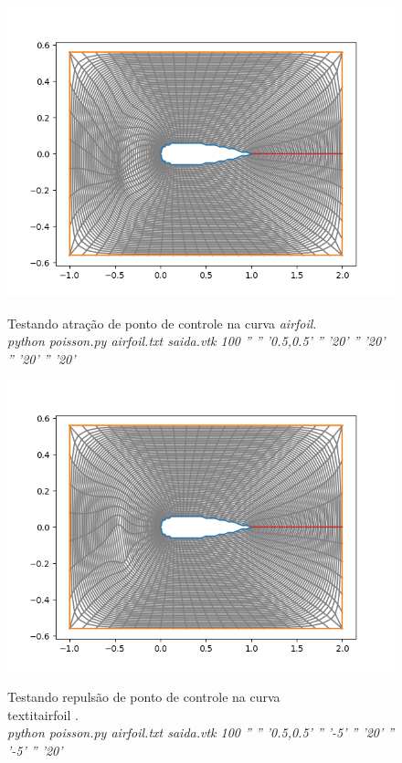 \documentclass[a4paper]{article}
\begin{document}
\begin{figure}[ht]
	\centering
	\includegraphics[width=1.0\textwidth]{airfoil_attract_point.png}
	\label{fig:airfoil_attract_point} 
	\caption[caption]{Testando atração de ponto de controle na curva \textit{airfoil}. \\\hspace{\textwidth} \textit{python poisson.py airfoil.txt saida.vtk 100 '' '' '0.5,0.5' '' '20' '' '20' '' '20' '' '20'}}
\end{figure}



\begin{figure}[]
	\centering
	\includegraphics[width=1.0\textwidth]{airfoil_repel_point.png}
	\label{fig:airfoil_repel_point} 
	\caption[caption]{Testando repulsão de ponto de controle na curva \\textit{airfoil} . \\\hspace{\textwidth} \textit{python poisson.py airfoil.txt saida.vtk 100 '' '' '0.5,0.5' '' '-5' '' '20' '' '-5' '' '20'}}
\end{figure}
\end{document}
